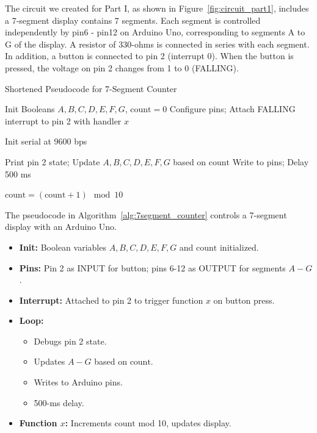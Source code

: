 \documentclass[journal]{IEEEtran}
\begin{document}
The circuit we created for Part I, as shown in Figure~\ref{fig:circuit_part1}, includes a 7-segment display contains 7 segments. Each segment is controlled independently by pin6 - pin12 on Arduino Uno, corresponding to segments A to G of the display. A resistor of 330-ohms is connected in series with each segment.
In addition, a button is connected to pin 2 (interrupt 0). When the button is pressed, the voltage on pin 2 changes from 1 to 0 (FALLING).
\begin{algorithm}
\caption{Shortened Pseudocode for 7-Segment Counter}\label{alg:7segment_counter}
\begin{algorithmic}[1]
\State Init Booleans \( A, B, C, D, E, F, G \), \( \text{count} = 0 \)
\State Configure pins; Attach FALLING interrupt to pin 2 with handler \( x \)

    \State Init serial at 9600 bps
\EndProcedure

    \State Print pin 2 state; Update \( A, B, C, D, E, F, G \) based on \( \text{count} \)
    \State Write to pins; Delay 500 ms
\EndProcedure

    \State \( \text{count} = (\text{count} + 1) \mod 10 \)
\EndProcedure
\end{algorithmic}
\end{algorithm}

The pseudocode in Algorithm~\ref{alg:7segment_counter} controls a 7-segment display with an Arduino Uno.
\begin{itemize}
    \item \textbf{Init:} Boolean variables \( A, B, C, D, E, F, G \) and \( \text{count} \) initialized.
    
    \item \textbf{Pins:} Pin 2 as INPUT for button; pins 6-12 as OUTPUT for segments \( A-G \).
    
    \item \textbf{Interrupt:} Attached to pin 2 to trigger function \( x \) on button press.
    
    \item \textbf{Loop:} 
    \begin{itemize}
        \item Debugs pin 2 state.
        \item Updates \( A-G \) based on \( \text{count} \).
        \item Writes to Arduino pins.
        \item 500-ms delay.
    \end{itemize}

    \item \textbf{Function \( x \):} Increments \( \text{count} \) mod 10, updates display.
\end{itemize}
\end{document}
